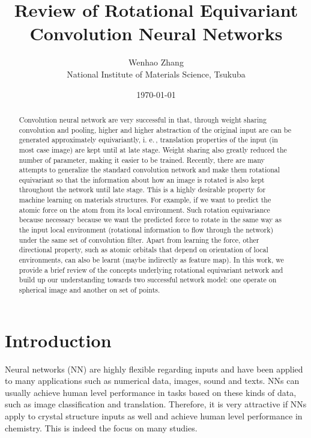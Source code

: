 \documentclass{IEEEtran}
\begin{document}
\title{Review of Rotational Equivariant Convolution Neural Networks}
\author{Wenhao Zhang \\ National Institute of Materials Science, Tsukuba}
\date{\today}

\maketitle

\begin{abstract}
    Convolution neural network are very successful in that, through weight sharing convolution and pooling, higher and higher abstraction 
    of the original input are can be generated approximately equivariantly, i. e.\,, translation properties of the input (in most case image)
    are kept until at late stage. Weight sharing also greatly reduced the number of parameter, making it easier to be trained. 
    Recently, there are many attempts to generalize the standard convolution network and make them rotational equivariant so that the information
    about how an image is rotated is also kept throughout the network until late stage. This is a highly desirable property for machine learning 
    on materials structures. For example, if we want to predict the atomic force on the atom from its local environment. Such rotation equivariance 
    because necessary because we want the predicted force to rotate in the same way as the input local environment 
    (rotational information to flow through the network) under the same set of convolution filter. 
    Apart from learning the force, other directional property, such as atomic orbitals that depend on orientation of local environments, can also 
    be learnt (maybe indirectly as feature map).
    In this work, we provide a brief review of the concepts underlying rotational equivariant network and build up our understanding towards two 
    successful network model: one operate on spherical image and another on set of points.
\end{abstract}

\section{Introduction}
Neural networks (NN) are highly flexible regarding inputs and have been applied to many applications
such as numerical data, images, sound and texts. NNs can usually achieve human level performance in
tasks based on these kinds of data, such as image classification and translation. 
Therefore, it is very attractive if NNs apply to crystal structure inputs as well and achieve human level 
performance in chemistry. This is indeed the focus on many studies. 
\end{document}
